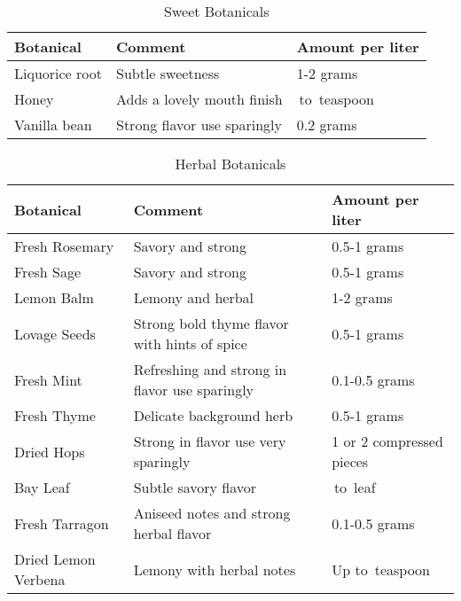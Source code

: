 \documentclass[letterpaper]{recipePMG}
\newcommand{\quarter}{\nicefrac{1}{4} \,}
\newcommand{\half}{\nicefrac{1}{2} \,}
\begin{document}
\begin{table}[H]
    \centering
    \caption{Sweet Botanicals}
    \begin{tabular}{@{}p{1.25in}p{3in}p{1.25in}@{}}
        \toprule
      Botanical &  Comment & Amount per liter \\
        \midrule
		Liquorice root & Subtle sweetness & 1-2 grams \\
		Honey & Adds a lovely mouth finish  & \quarter to \half teaspoon \\
		Vanilla bean & Strong flavor use sparingly & 0.2 grams \\
\end{tabular}
    \label{tab:sweet}
\end{table}

\begin{table}[H]
    \centering
    \caption{Herbal Botanicals}
    \begin{tabular}{@{}p{1.25in}p{3in}p{1.25in}@{}}
        \toprule
      Botanical &  Comment & Amount per liter \\
        \midrule
		Fresh Rosemary & Savory and strong &  0.5-1 grams \\
		Fresh Sage & Savory and strong & 0.5-1 grams \\
		Lemon Balm & Lemony and herbal & 1-2 grams \\
		Lovage Seeds & Strong bold thyme flavor with hints of spice & 0.5-1 grams\\
		Fresh Mint & Refreshing and strong in flavor use sparingly & 0.1-0.5 grams\\
		Fresh Thyme & Delicate background herb & 0.5-1 grams \\
		Dried Hops & Strong in flavor use very sparingly & 1 or 2 compressed pieces\\
		Bay Leaf & Subtle savory flavor & \quarter to \half leaf \\
		Fresh Tarragon &  Aniseed notes and strong herbal flavor & 0.1-0.5 grams\\
		Dried Lemon Verbena & Lemony with herbal notes & Up to \half teaspoon \\
\end{tabular}
    \label{tab:herbal}
\end{table}
\end{document}
